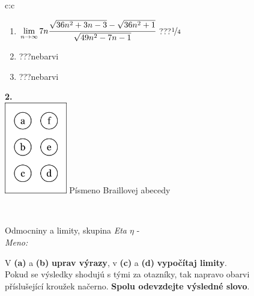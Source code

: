 \documentclass[10pt]{report}
\begin{document}
\begin{tabular}{c:c}
\begin{minipage}[c][104.5mm][t]{0.5\linewidth}
\begin{center}
\begin{minipage}{0.79\linewidth}
\begin{center}
\begin{varwidth}{\linewidth}
\begin{enumerate}
\item $\lim\limits_{n\to\infty}7n\cfrac{\sqrt{36n^2+3n-3}-\sqrt{36n^2+1}}{\sqrt{49n^2-7n-1}}$\quad \dotfill\; ???\;\dotfill \quad $\nicefrac{1}{4}$
\item \quad \dotfill\; ???\;\dotfill \quad nebarvi
\item \quad \dotfill\; ???\;\dotfill \quad nebarvi
\end{enumerate}
\end{varwidth}
\end{center}
\end{minipage}
\begin{minipage}{0.20\linewidth}
\begin{center}
{\Huge\bfseries 2.} \\[2mm]
\includegraphics[height=40mm]{../images/braille.png}
{\small Písmeno Braillovej abecedy}
\end{center}
\end{minipage}
\end{center}
\end{minipage}
\\ \hdashline
\begin{minipage}[c][104.5mm][t]{0.5\linewidth}
\begin{center}
\vspace{7mm}
{\huge Odmocniny a limity, skupina \textit{Eta $\eta$} -}\\[5mm]
\textit{Meno:}\phantom{xxxxxxxxxxxxxxxxxxxxxxxxxxxxxxxxxxxxxxxxxxxxxxxxxxxxxxxxxxxxxxxxx}\\[5mm]
\begin{minipage}{0.95\linewidth}
\begin{center}
V \textbf{(a)} a \textbf{(b)} \textbf{uprav výrazy}, v \textbf{(c)} a \textbf{(d)} \textbf{vypočítaj limity}.\\Pokud se výsledky shodujú s tými za otazníky, tak napravo obarvi\\příslušející kroužek načerno. \textbf{Spolu odevzdejte výsledné slovo}.
\end{center}
\end{minipage}
\\[1mm]

\end{center}
\end{minipage}
\end{tabular}
\end{document}
